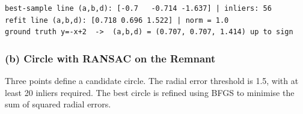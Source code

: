 \documentclass[11pt]{article}
\begin{document}
    \begin{Verbatim}[commandchars=\\\{\}]
best-sample line (a,b,d): [-0.7   -0.714 -1.637] | inliers: 56
refit line (a,b,d): [0.718 0.696 1.522] | norm = 1.0
ground truth y=-x+2  ->  (a,b,d) = (0.707, 0.707, 1.414) up to sign
    \end{Verbatim}

    \subsubsection{(b) Circle with RANSAC on the
Remnant}\label{b-circle-with-ransac-on-the-remnant}

Three points define a candidate circle. The radial error threshold is
1.5, with at least 20 inliers required. The best circle is refined using
BFGS to minimise the sum of squared radial errors.
\end{document}
